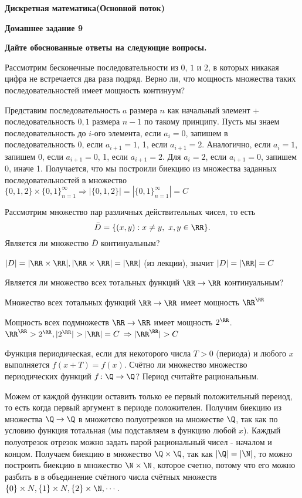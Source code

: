 \documentclass[11pt]{article}
\def\week{9}
\def\theproblem{К\week.\arabic{problem}}
\begin{document}
	\setcounter{problem}{0}
	\def\theproblem{Д\week.\arabic{problem}}
	{\textbf{\large Дискретная математика}\hfill \textbf{(Основной поток)}
		
		\medskip %
		
		\textbf{Домашнее задание \week}}
	
	\medskip
	
	\textbf{Дайте обоснованные ответы на следующие вопросы.}
	
	
	\vspace{5mm}
	
	
	\p Рассмотрим бесконечные последовательности из $0$, $1$ и $2$, в
	которых никакая цифра не встречается два раза подряд. Верно ли, что
	мощность множества таких последовательностей имеет мощность континуум?
	
	Представим последовательность $a$ размера $n$ как начальный элемент + последовательность  ${0,1}$ размера $n - 1$ по такому принципу. Пусть мы знаем последовательность до $i$-ого элемента, если $a_i = 0$, запишем в последовательность 0, если $a_{i + 1} = 1$, 1, если $a_{i + 1} = 2$. Аналогично, если $a_i = 1$, запишем 0, если $a_{i + 1} = 0$, 1, если $a_{i + 1} = 2$. Для $a_i = 2$, если $a_{i + 1} = 0$, запишем 0, иначе 1. Получается, что мы построили биекцию из множества заданных последовательностей в множество $\{0,1,2\}\times{\{0,1\}}_{n = 1}^{\infty} \Rightarrow |\{0,1,2\}| = |{\{0,1\}}_{n = 1}^{\infty}| = C$ 
	
	
	\p Рассмотрим множество пар различных действительных чисел, то есть
	\[\bar D = \{(x,y) : x\ne y, \ x,y\in \RR\}.\] Является ли множество $\bar D$ континуальным?
	
	$|D| = |\RR \times \RR|, |\RR \times \RR| = |\RR|$ (из лекции), значит $|D| = |\RR| = C$ 
	
	
	\p Является ли множество всех тотальных функций $\RR\to\RR$ континуальным?
	
	Множество всех тотальных функций $\RR\to\RR$ имеет мощность $\RR^{\RR}$
	
	Мощность всех подмножеств $\RR\to\RR$ имеет мощность $2^\RR$. $\RR^{\RR} > 2^\RR, |2^\RR| > |\RR| = C$ $\Rightarrow |\RR^{\RR}| > C$ 
	
	
	\p Функция периодическая, если для некоторого числа $T>0$ (периода) и любого $x$ выполняется $f(x+T)=f(x)$. Счётно ли множество множество периодических функций  $f\colon \Q\to\Q$? Период считайте рациональным. 
	
	Можем от каждой функции оставить только ее первый положительный переиод, то есть когда первый аргумент в  периоде положителен. Получим биекцию из множества  $\Q\to\Q$ в множетсво полуотрезков на множестве $\Q$, так как по условию функция тотальная (мы подставляем в функцию любой $x$). Каждый полуотрезок отрезок можно задать парой рациональный чисел - началом и концом. Получаем биекцию в множество $\Q \times \Q$, так как $|\Q| = |\N|$, то можно построить биекцию в множество $\N \times \N$, которое счетно, потому что его можно разбить в в объединение счётного числа счётных множеств $\{0\} \times N, \{1\} \times N, \{2\} \times \N, \cdots$. 
	
	
\end{document}

